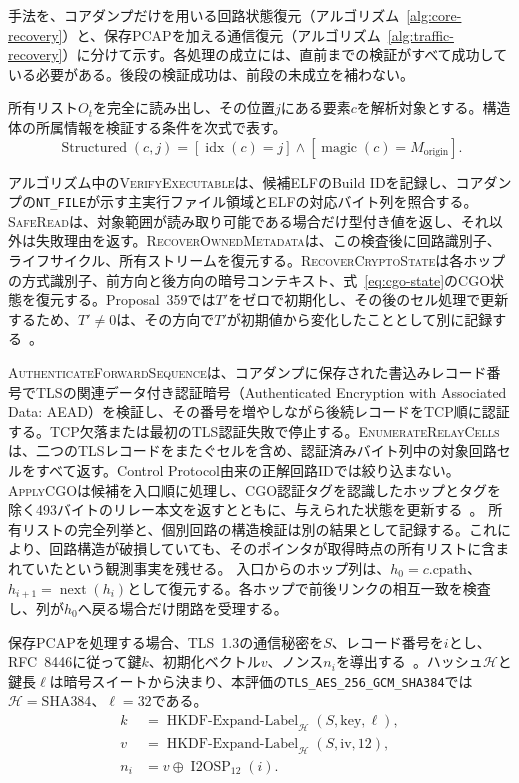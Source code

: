 \documentclass[10pt,a4paper]{ltjsarticle}
\newcommand{\code}[1]{\nolinkurl{#1}}
\begin{document}
手法を、コアダンプだけを用いる回路状態復元（アルゴリズム~\ref{alg:core-recovery}）と、保存PCAPを加える通信復元（アルゴリズム~\ref{alg:traffic-recovery}）に分けて示す。各処理の成立には、直前までの検証がすべて成功している必要がある。後段の検証成功は、前段の未成立を補わない。

所有リスト$O_t$を完全に読み出し、その位置$j$にある要素$c$を解析対象とする。構造体の所属情報を検証する条件を次式で表す。
\begin{equation}
\operatorname{Structured}(c,j)=
[\operatorname{idx}(c)=j]\land[\operatorname{magic}(c)=M_{\mathrm{origin}}].
\label{eq:structured}
\end{equation}

アルゴリズム中の\textsc{VerifyExecutable}は、候補ELFのBuild IDを記録し、コアダンプの\code{NT_FILE}が示す主実行ファイル領域とELFの対応バイト列を照合する。\textsc{SafeRead}は、対象範囲が読み取り可能である場合だけ型付き値を返し、それ以外は失敗理由を返す。\textsc{RecoverOwnedMetadata}は、この検査後に回路識別子、ライフサイクル、所有ストリームを復元する。\textsc{RecoverCryptoState}は各ホップの方式識別子、前方向と後方向の暗号コンテキスト、式~\eqref{eq:cgo-state}のCGO状態を復元する。Proposal~359では$T'$をゼロで初期化し、その後のセル処理で更新するため、$T'\neq0$は、その方向で$T'$が初期値から変化したこととして別に記録する~\cite{torproposal359,ctorsource04916}。

\textsc{AuthenticateForwardSequence}は、コアダンプに保存された書込みレコード番号でTLSの関連データ付き認証暗号（Authenticated Encryption with Associated Data: AEAD）を検証し、その番号を増やしながら後続レコードをTCP順に認証する。TCP欠落または最初のTLS認証失敗で停止する。\textsc{EnumerateRelayCells}は、二つのTLSレコードをまたぐセルを含め、認証済みバイト列中の対象回路セルをすべて返す。Control Protocol由来の正解回路IDでは絞り込まない。\textsc{ApplyCGO}は候補を入口順に処理し、CGO認証タグを認識したホップとタグを除く493バイトのリレー本文を返すとともに、与えられた状態を更新する~\cite{torproposal359}。
所有リストの完全列挙と、個別回路の構造検証は別の結果として記録する。これにより、回路構造が破損していても、そのポインタが取得時点の所有リストに含まれていたという観測事実を残せる。
入口からのホップ列は、$h_0=c.\mathrm{cpath}$、$h_{i+1}=\operatorname{next}(h_i)$として復元する。各ホップで前後リンクの相互一致を検査し、列が$h_0$へ戻る場合だけ閉路を受理する。

保存PCAPを処理する場合、TLS~1.3の通信秘密を$S$、レコード番号を$i$とし、RFC~8446に従って鍵$k$、初期化ベクトル$v$、ノンス$n_i$を導出する~\cite{rfc8446}。ハッシュ$\mathcal H$と鍵長$\ell$は暗号スイートから決まり、本評価の\code{TLS_AES_256_GCM_SHA384}では$\mathcal H=\mathrm{SHA384}$、$\ell=32$である。
\begin{align}
  k &= \operatorname{HKDF\mbox{-}Expand\mbox{-}Label}_{\mathcal H}(S,\mathrm{key},\ell),\label{eq:tls-key}\\
  v &= \operatorname{HKDF\mbox{-}Expand\mbox{-}Label}_{\mathcal H}(S,\mathrm{iv},12),\\
  n_i &= v \oplus \operatorname{I2OSP}_{12}(i).
\end{align}
\end{document}
